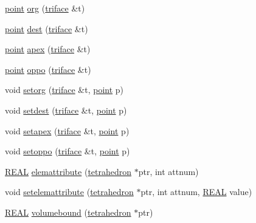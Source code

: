\begin{DoxyCompactItemize}
\item 
\hyperlink{classtetgenmesh_ace3fb4f80389185b7c9b18ab69a3dea2}{point} \hyperlink{classtetgenmesh_ae2d4d27d7babd7b0e60956cc00bca89a}{org} (\hyperlink{classtetgenmesh_1_1triface}{triface} \&t)
\item 
\hyperlink{classtetgenmesh_ace3fb4f80389185b7c9b18ab69a3dea2}{point} \hyperlink{classtetgenmesh_ad56ef3448cd57e637acf373622bfb769}{dest} (\hyperlink{classtetgenmesh_1_1triface}{triface} \&t)
\item 
\hyperlink{classtetgenmesh_ace3fb4f80389185b7c9b18ab69a3dea2}{point} \hyperlink{classtetgenmesh_a9287d941f7f432ca846d5c004603af40}{apex} (\hyperlink{classtetgenmesh_1_1triface}{triface} \&t)
\item 
\hyperlink{classtetgenmesh_ace3fb4f80389185b7c9b18ab69a3dea2}{point} \hyperlink{classtetgenmesh_a2ff33d38976a7bc134380ef8f15c4519}{oppo} (\hyperlink{classtetgenmesh_1_1triface}{triface} \&t)
\item 
void \hyperlink{classtetgenmesh_a6ae234588aff3334e96cd1798d6e3129}{setorg} (\hyperlink{classtetgenmesh_1_1triface}{triface} \&t, \hyperlink{classtetgenmesh_ace3fb4f80389185b7c9b18ab69a3dea2}{point} p)
\item 
void \hyperlink{classtetgenmesh_a0fe745e12c7d0ce253a8d4486992ed7e}{setdest} (\hyperlink{classtetgenmesh_1_1triface}{triface} \&t, \hyperlink{classtetgenmesh_ace3fb4f80389185b7c9b18ab69a3dea2}{point} p)
\item 
void \hyperlink{classtetgenmesh_a0f00b784db4aba3d5d3f7c7b09ed12dc}{setapex} (\hyperlink{classtetgenmesh_1_1triface}{triface} \&t, \hyperlink{classtetgenmesh_ace3fb4f80389185b7c9b18ab69a3dea2}{point} p)
\item 
void \hyperlink{classtetgenmesh_abb76d76639d4f8cedc41c86d6fa2f180}{setoppo} (\hyperlink{classtetgenmesh_1_1triface}{triface} \&t, \hyperlink{classtetgenmesh_ace3fb4f80389185b7c9b18ab69a3dea2}{point} p)
\item 
\hyperlink{tetgen_8h_a4b654506f18b8bfd61ad2a29a7e38c25}{R\+E\+AL} \hyperlink{classtetgenmesh_abffbd551714f2e119e0f8ba3e4e54c92}{elemattribute} (\hyperlink{classtetgenmesh_a6a12b1c0d1834ca941d16c62e949e5e3}{tetrahedron} $\ast$ptr, int attnum)
\item 
void \hyperlink{classtetgenmesh_a0a648fdfb850a6d706e96bf62a18f761}{setelemattribute} (\hyperlink{classtetgenmesh_a6a12b1c0d1834ca941d16c62e949e5e3}{tetrahedron} $\ast$ptr, int attnum, \hyperlink{tetgen_8h_a4b654506f18b8bfd61ad2a29a7e38c25}{R\+E\+AL} value)
\item 
\hyperlink{tetgen_8h_a4b654506f18b8bfd61ad2a29a7e38c25}{R\+E\+AL} \hyperlink{classtetgenmesh_acbf906f467a4da46e7f89812cef268d7}{volumebound} (\hyperlink{classtetgenmesh_a6a12b1c0d1834ca941d16c62e949e5e3}{tetrahedron} $\ast$ptr)

\end{DoxyCompactItemize}

